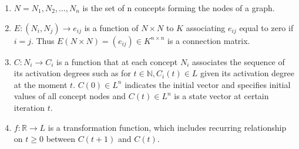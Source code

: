 \documentclass[conference]{IEEEtran}
\begin{document}
\begin{enumerate}
\item \begin{math} N = {N_{1},N_{2},...,N_{n}} \end{math} is the set of n concepts forming the nodes of a graph.
\item \begin{math} E: (N_{i},N_{j}) \rightarrow e_{ij} \end{math} is a function of \begin{math} N \times N \end{math} to \begin{math} K \end{math} associating \begin{math} e_{ij} \end{math} equal to zero if \begin{math} i = j \end{math}. Thus \begin{math} E(N \times N) = (e_{ij}) \in K^{n \times n} \end{math} is a connection matrix.
\item \begin{math} C: N_{i} \rightarrow C_{i} \end{math} is a function that at each concept \begin{math} N_{i} \end{math} associates the sequence of its activation degrees such as for \begin{math} t \in \mathbb{N}, C_{i}(t) \in L \end{math} given its activation degree at the moment \begin{math} t \end{math}. \begin{math} C(0) \in L^{n} \end{math} indicates the initial vector and specifies initial values of all concept nodes and \begin{math} C(t) \in L^{n} \end{math} is a state vector at certain iteration \begin{math} t \end{math}.
\item \begin{math} f: \mathbb{R} \rightarrow L \end{math} is a transformation function, which includes recurring relationship on \begin{math} t \geq 0 \end{math} between \begin{math} C(t+1) \end{math} and \begin{math} C(t) \end{math}.
\end{enumerate}
\end{document}
